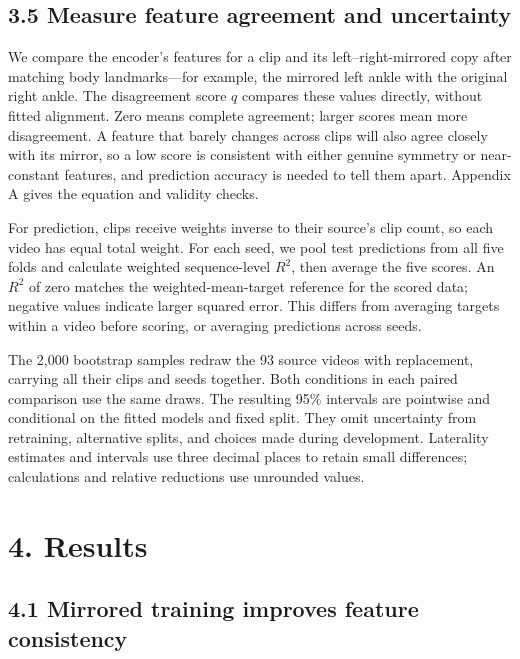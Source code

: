 \documentclass{article}
\begin{document}
\subsection{3.5 Measure feature agreement and
uncertainty}\label{measure-feature-agreement-and-uncertainty}

We compare the encoder's features for a clip and its
left--right-mirrored copy after matching body landmarks---for example,
the mirrored left ankle with the original right ankle. The disagreement
score \(q\) compares these values directly, without fitted alignment.
Zero means complete agreement; larger scores mean more disagreement. A
feature that barely changes across clips will also agree closely with
its mirror, so a low score is consistent with either genuine symmetry or
near-constant features, and prediction accuracy is needed to tell them
apart. Appendix A gives the equation and validity checks.

For prediction, clips receive weights inverse to their source's clip
count, so each video has equal total weight. For each seed, we pool test
predictions from all five folds and calculate weighted sequence-level
\(R^2\), then average the five scores. An \(R^2\) of zero matches the
weighted-mean-target reference for the scored data; negative values
indicate larger squared error. This differs from averaging targets
within a video before scoring, or averaging predictions across seeds.

The 2,000 bootstrap samples redraw the 93 source videos with
replacement, carrying all their clips and seeds together. Both
conditions in each paired comparison use the same draws. The resulting
95\% intervals are pointwise and conditional on the fitted models and
fixed split. They omit uncertainty from retraining, alternative splits,
and choices made during development. Laterality estimates and intervals
use three decimal places to retain small differences; calculations and
relative reductions use unrounded values.

\section{4. Results}\label{results}

\subsection{4.1 Mirrored training improves feature
consistency}\label{mirrored-training-improves-feature-consistency}
\end{document}
